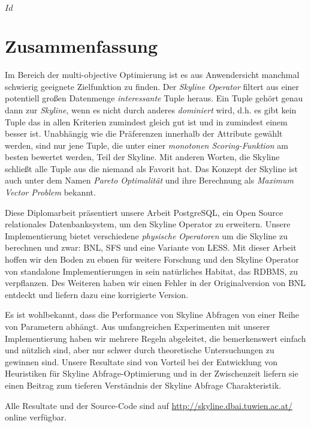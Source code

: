 
\svnInfo $Id$


\chapter*{Zusammenfassung\revision}


Im Bereich der multi-objective Optimierung ist es aus Anwendersicht
manchmal schwierig geeignete Zielfunktion zu finden.
%
Der \emph{Skyline Operator} filtert aus einer potentiell gro\ss{}en
Datenmenge \emph{interessante} Tuple heraus.
%
Ein Tuple geh\"ort genau dann zur \emph{Skyline}, wenn es nicht durch
anderes \emph{dominiert} wird, d.h. es gibt kein Tuple das in allen
Kriterien zumindest gleich gut ist und in zumindest einem besser ist.
%
Unabh\"angig wie die Pr\"aferenzen innerhalb der Attribute gew\"ahlt
werden, sind nur jene Tuple, die unter einer \emph{monotonen
Scoring-Funktion} am besten bewertet werden, Teil der Skyline.
%
Mit anderen Worten, die Skyline schlie\ss{}t alle Tuple aus die
niemand als Favorit hat.
%
Das Konzept der Skyline ist auch unter dem Namen \emph{Pareto
Optimalit\"at} und ihre Berechnung als \emph{Maximum Vector
Problem} bekannt.


Diese Diplomarbeit pr\"asentiert unsere Arbeit PostgreSQL, ein Open
Source relationales Datenbanksystem, um den Skyline Operator zu
erweitern.
%
Unsere Implementierung bietet verschiedene \emph{physische Operatoren}
um die Skyline zu berechnen und zwar: BNL, SFS und eine Variante von
LESS.
%
Mit dieser Arbeit hoffen wir den Boden zu ebnen f\"ur weitere
Forschung und den Skyline Operator von standalone Implementierungen in
sein nat\"urliches Habitat, das RDBMS, zu verpflanzen.
%
Des Weiteren haben wir einen Fehler in der Originalversion von BNL
entdeckt und liefern dazu eine korrigierte Version.


Es ist wohlbekannt, dass die Performance von Skyline Abfragen von einer
Reihe von Parametern abh\"angt.
%
Aus umfangreichen Experimenten mit unserer Implementierung haben wir
mehrere Regeln abgeleitet, die bemerkenswert einfach und n\"utzlich
sind, aber nur schwer durch theoretische Untersuchungen zu gewinnen
sind.
%
Unsere Resultate sind von Vorteil bei der Entwicklung von Heuristiken
f\"ur Skyline Abfrage-Optimierung und in der Zwischenzeit liefern sie
einen Beitrag zum tieferen Verst\"andnis der Skyline Abfrage
Charakteristik.


Alle Resultate und der Source-Code sind auf
\url{http://skyline.dbai.tuwien.ac.at/} online verf\"ugbar.
